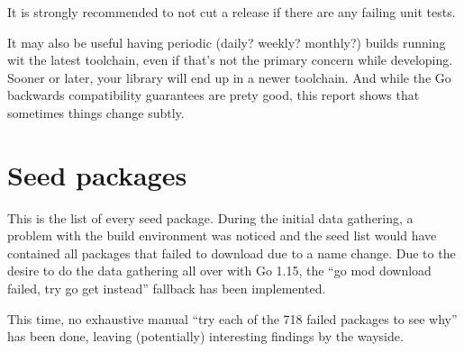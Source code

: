 \documentclass[a4paper]{paper}
\begin{document}
It is strongly recommended to not cut a release if there are any
failing unit tests.

It may also be useful having periodic (daily? weekly? monthly?) builds
running wit the latest toolchain, even if that's not the primary
concern while developing. Sooner or later, your library will end up in
a newer toolchain. And while the Go backwards compatibility guarantees
are prety good, this report shows that sometimes things change subtly.

\section{Seed packages}

This is the list of every seed package. During the initial data gathering, a
problem with the build environment was noticed and the seed list
would have contained all packages that failed to download due to a name
change. Due to the desire to do the data gathering all over with Go 1.15, the ``go mod download failed, try go get instead'' fallback has been implemented.

This time, no exhaustive manual ``try each of the 718 failed packages
to see why'' has been done, leaving (potentially) interesting findings
by the wayside.


\end{document}
